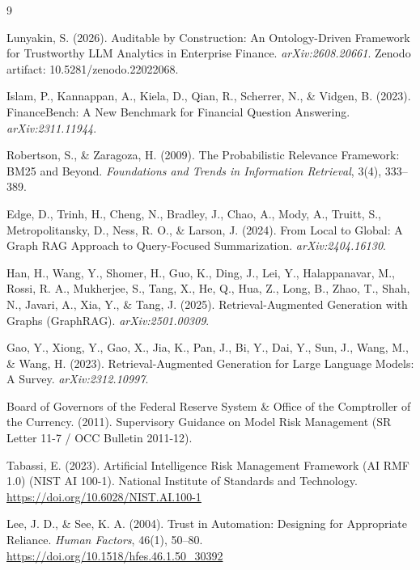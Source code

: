 \documentclass[11pt]{article}
\begin{document}
\begin{thebibliography}{9}

Lunyakin, S. (2026). Auditable by Construction: An Ontology-Driven Framework for Trustworthy LLM Analytics in Enterprise Finance. \emph{arXiv:2608.20661}. Zenodo artifact: 10.5281/zenodo.22022068.

Islam, P., Kannappan, A., Kiela, D., Qian, R., Scherrer, N., \& Vidgen, B. (2023). FinanceBench: A New Benchmark for Financial Question Answering. \emph{arXiv:2311.11944}.

Robertson, S., \& Zaragoza, H. (2009). The Probabilistic Relevance Framework: BM25 and Beyond. \emph{Foundations and Trends in Information Retrieval}, 3(4), 333--389.

Edge, D., Trinh, H., Cheng, N., Bradley, J., Chao, A., Mody, A., Truitt, S., Metropolitansky, D., Ness, R. O., \& Larson, J. (2024). From Local to Global: A Graph RAG Approach to Query-Focused Summarization. \emph{arXiv:2404.16130}.

Han, H., Wang, Y., Shomer, H., Guo, K., Ding, J., Lei, Y., Halappanavar, M., Rossi, R. A., Mukherjee, S., Tang, X., He, Q., Hua, Z., Long, B., Zhao, T., Shah, N., Javari, A., Xia, Y., \& Tang, J. (2025). Retrieval-Augmented Generation with Graphs (GraphRAG). \emph{arXiv:2501.00309}.

Gao, Y., Xiong, Y., Gao, X., Jia, K., Pan, J., Bi, Y., Dai, Y., Sun, J., Wang, M., \& Wang, H. (2023). Retrieval-Augmented Generation for Large Language Models: A Survey. \emph{arXiv:2312.10997}.

Board of Governors of the Federal Reserve System \& Office of the Comptroller of the Currency. (2011). Supervisory Guidance on Model Risk Management (SR Letter 11-7 / OCC Bulletin 2011-12).

Tabassi, E. (2023). Artificial Intelligence Risk Management Framework (AI RMF 1.0) (NIST AI 100-1). National Institute of Standards and Technology. \url{https://doi.org/10.6028/NIST.AI.100-1}

Lee, J. D., \& See, K. A. (2004). Trust in Automation: Designing for Appropriate Reliance. \emph{Human Factors}, 46(1), 50--80. \url{https://doi.org/10.1518/hfes.46.1.50_30392}

\end{thebibliography}
\end{document}
